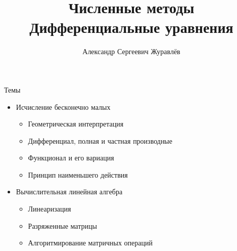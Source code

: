 \documentclass[12pt]{beamer}
\author{Александр Сергеевич Журавлёв}
\title[Дифференциальные уравнения]{Численные методы \\ Дифференциальные уравнения}
\institute{Физико-технический институт}
\begin{document}
\begin{frame}
    \titlepage
\end{frame}


\begin{frame}{Темы}
    \begin{itemize}
        \item Исчисление бесконечно малых
            \begin{itemize}
                \item Геометрическая интерпретация
                \item Дифференциал, полная и частная производные                
                \item Функционал и его вариация
                \item Принцип наименьшего действия
            \end{itemize}
        \vspace{0.2 cm}    
        \item Вычислительная линейная алгебра
            \begin{itemize}
                \item Линеаризация
                \item Разряженные матрицы
                \item Алгоритмирование матричных операций
            \end{itemize}                                          
    \end{itemize}
\end{frame}
\end{document}
